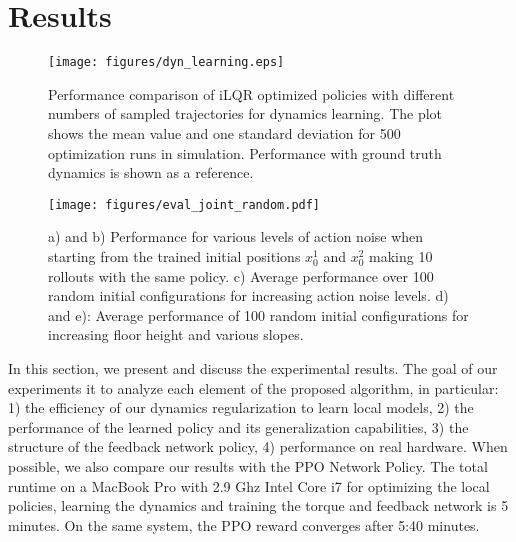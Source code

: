 \section{Results}
\begin{figure}
    \centering
    \texttt{[image: figures/dyn\_learning.eps]}
%
    \caption{Performance comparison of iLQR optimized policies with different numbers of sampled trajectories for dynamics learning. The plot shows the mean value and one standard deviation for 500 optimization runs in simulation. Performance with ground truth dynamics is shown as a reference.}
%
    \label{fig:result_dyn_learning}
    \vspace{-0.6cm}
\end{figure}
%
\begin{figure*}[h]
    \centering
        \texttt{[image: figures/eval\_joint\_random.pdf]}
    \caption{a) and b) Performance for various levels of action noise when starting from the trained initial positions $x_0^1$ and $x_0^2$ making 10 rollouts with the same policy. c) Average performance over 100 random initial configurations for increasing action noise levels. d) and e): Average performance of 100 random initial configurations for increasing floor height and various slopes. }
    \label{fig:result_noise}
    \vspace{-0.7cm}
\end{figure*}
\label{sec:results}
In this section, we present and discuss the experimental results. The goal of our experiments it to analyze each element of the proposed algorithm, in particular: 1) the efficiency of our dynamics regularization to learn local models, 2) the performance of the learned policy and its generalization capabilities, 3) the structure of the feedback network policy, 4) performance on real hardware. When possible, we also compare our results with the PPO Network Policy. The total runtime on a MacBook Pro with 2.9 Ghz Intel Core i7 for optimizing the local policies, learning the dynamics and training the torque and feedback network is 5 minutes. On the same system, the PPO reward converges after 5:40 minutes.
%
